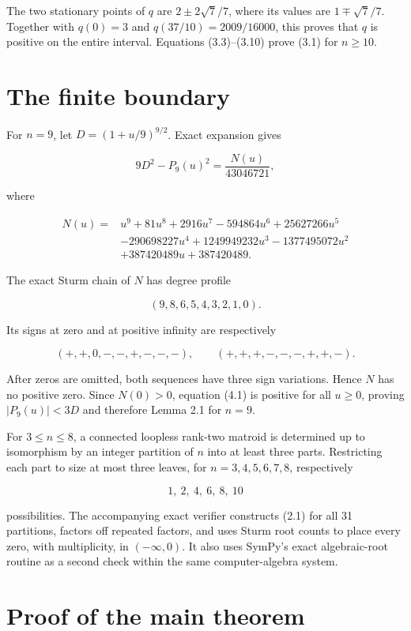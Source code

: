 \documentclass[11pt]{article}
\begin{document}
The two stationary points of $q$ are $2\pm2\sqrt7/7$, where its
values are $1\mp\sqrt7/7$. Together with
$q(0)=3$ and $q(37/10)=2009/16000$, this proves that $q$ is positive
on the entire interval. Equations (3.3)--(3.10) prove (3.1) for $n\ge10$.

\section{The finite boundary}


For $n=9$, let $D=(1+u/9)^{9/2}$. Exact expansion gives

\[
9D^2-P_9(u)^2=\frac{N(u)}{43046721},                                \tag{4.1}
\]

where

\[
\begin{aligned}
N(u)={}&u^9+81u^8+2916u^7-594864u^6+25627266u^5\\
&-290698227u^4+1249949232u^3-1377495072u^2\\
&+387420489u+387420489.
\end{aligned}
\]

The exact Sturm chain of $N$ has degree profile

\[
(9,8,6,5,4,3,2,1,0).
\]

Its signs at zero and at positive infinity are respectively

\[
(+,+,0,-,-,+,-,-,-),
\qquad (+,+,+,-,-,-,+,+,-).
\]

After zeros are omitted, both sequences have three sign variations. Hence
$N$ has no positive zero. Since $N(0)>0$, equation (4.1) is positive for
all $u\ge0$, proving $|P_9(u)|<3D$ and therefore Lemma 2.1 for $n=9$.

For $3\le n\le8$, a connected loopless rank-two matroid is determined up
to isomorphism by an integer partition of $n$ into at least three parts.
Restricting each part to size at most three leaves, for
$n=3,4,5,6,7,8$, respectively

\[
1,\ 2,\ 4,\ 6,\ 8,\ 10
\]

possibilities. The accompanying exact verifier constructs (2.1) for all 31
partitions, factors off repeated factors, and uses Sturm root counts to place
every zero, with multiplicity, in $(-\infty,0)$. It also uses SymPy's exact
algebraic-root routine as a second check within the same computer-algebra
system.

\section{Proof of the main theorem}
\end{document}
